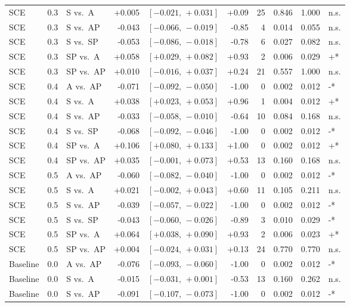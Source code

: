 \begin{landscape}
\begin{scriptsize}
\begin{longtable}{lllrrrrrrl}
SCE & 0.3 & S vs.\ A & +0.005 & $[-0.021,\,+0.031]$ & +0.09 & 25 & 0.846 & 1.000 & n.s. \\
SCE & 0.3 & S vs.\ AP & -0.043 & $[-0.066,\,-0.019]$ & -0.85 & 4 & 0.014 & 0.055 & n.s. \\
SCE & 0.3 & S vs.\ SP & -0.053 & $[-0.086,\,-0.018]$ & -0.78 & 6 & 0.027 & 0.082 & n.s. \\
SCE & 0.3 & SP vs.\ A & +0.058 & $[+0.029,\,+0.082]$ & +0.93 & 2 & 0.006 & 0.029 & +* \\
SCE & 0.3 & SP vs.\ AP & +0.010 & $[-0.016,\,+0.037]$ & +0.24 & 21 & 0.557 & 1.000 & n.s. \\
SCE & 0.4 & A vs.\ AP & -0.071 & $[-0.092,\,-0.050]$ & -1.00 & 0 & 0.002 & 0.012 & -* \\
SCE & 0.4 & S vs.\ A & +0.038 & $[+0.023,\,+0.053]$ & +0.96 & 1 & 0.004 & 0.012 & +* \\
SCE & 0.4 & S vs.\ AP & -0.033 & $[-0.058,\,-0.010]$ & -0.64 & 10 & 0.084 & 0.168 & n.s. \\
SCE & 0.4 & S vs.\ SP & -0.068 & $[-0.092,\,-0.046]$ & -1.00 & 0 & 0.002 & 0.012 & -* \\
SCE & 0.4 & SP vs.\ A & +0.106 & $[+0.080,\,+0.133]$ & +1.00 & 0 & 0.002 & 0.012 & +* \\
SCE & 0.4 & SP vs.\ AP & +0.035 & $[-0.001,\,+0.073]$ & +0.53 & 13 & 0.160 & 0.168 & n.s. \\
SCE & 0.5 & A vs.\ AP & -0.060 & $[-0.082,\,-0.040]$ & -1.00 & 0 & 0.002 & 0.012 & -* \\
SCE & 0.5 & S vs.\ A & +0.021 & $[-0.002,\,+0.043]$ & +0.60 & 11 & 0.105 & 0.211 & n.s. \\
SCE & 0.5 & S vs.\ AP & -0.039 & $[-0.057,\,-0.022]$ & -1.00 & 0 & 0.002 & 0.012 & -* \\
SCE & 0.5 & S vs.\ SP & -0.043 & $[-0.060,\,-0.026]$ & -0.89 & 3 & 0.010 & 0.029 & -* \\
SCE & 0.5 & SP vs.\ A & +0.064 & $[+0.038,\,+0.090]$ & +0.93 & 2 & 0.006 & 0.023 & +* \\
SCE & 0.5 & SP vs.\ AP & +0.004 & $[-0.024,\,+0.031]$ & +0.13 & 24 & 0.770 & 0.770 & n.s. \\
Baseline & 0.0 & A vs.\ AP & -0.076 & $[-0.093,\,-0.060]$ & -1.00 & 0 & 0.002 & 0.012 & -* \\
Baseline & 0.0 & S vs.\ A & -0.015 & $[-0.031,\,+0.001]$ & -0.53 & 13 & 0.160 & 0.262 & n.s. \\
Baseline & 0.0 & S vs.\ AP & -0.091 & $[-0.107,\,-0.073]$ & -1.00 & 0 & 0.002 & 0.012 & -* \\

\end{longtable}
\end{scriptsize}
\end{landscape}
